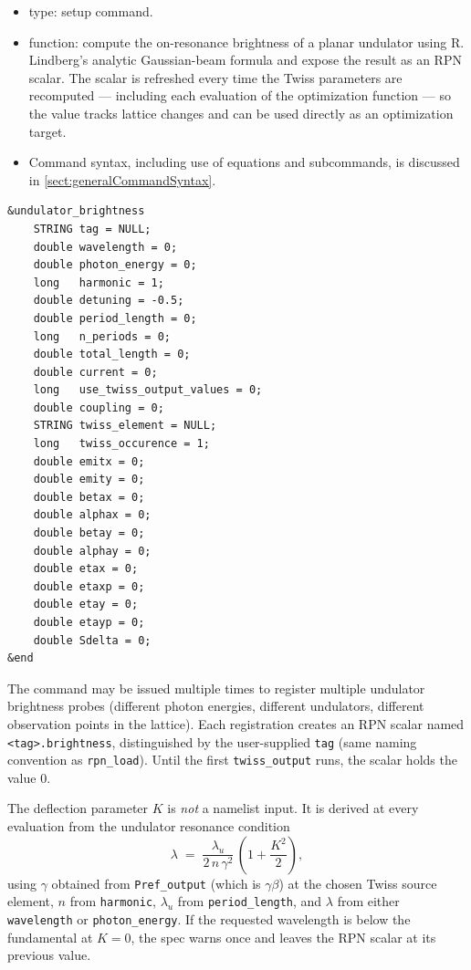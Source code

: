 \documentclass[11pt]{article}
\begin{document}
\begin{itemize}
\item type: setup command.
\item function: compute the on-resonance brightness of a planar undulator
        using R. Lindberg's analytic Gaussian-beam formula and expose the
        result as an RPN scalar.  The scalar is refreshed every time the
        Twiss parameters are recomputed --- including each evaluation of
        the optimization function --- so the value tracks lattice changes
        and can be used directly as an optimization target.
\item Command syntax, including use of equations and subcommands, is
        discussed in \ref{sect:generalCommandSyntax}.
\end{itemize}

\begin{verbatim}
&undulator_brightness
    STRING tag = NULL;
    double wavelength = 0;
    double photon_energy = 0;
    long   harmonic = 1;
    double detuning = -0.5;
    double period_length = 0;
    long   n_periods = 0;
    double total_length = 0;
    double current = 0;
    long   use_twiss_output_values = 0;
    double coupling = 0;
    STRING twiss_element = NULL;
    long   twiss_occurence = 1;
    double emitx = 0;
    double emity = 0;
    double betax = 0;
    double alphax = 0;
    double betay = 0;
    double alphay = 0;
    double etax = 0;
    double etaxp = 0;
    double etay = 0;
    double etayp = 0;
    double Sdelta = 0;
&end
\end{verbatim}

The command may be issued multiple times to register multiple undulator
brightness probes (different photon energies, different undulators,
different observation points in the lattice).  Each registration
creates an RPN scalar named \verb|<tag>.brightness|, distinguished by
the user-supplied \verb|tag| (same naming convention as
\verb|rpn_load|).  Until the first \verb|twiss_output| runs, the
scalar holds the value 0.

The deflection parameter $K$ is {\em not} a namelist input.  It is
derived at every evaluation from the undulator resonance condition
\begin{equation}
\lambda \;=\; \frac{\lambda_u}{2\,n\,\gamma^{2}}\,
              \left(1 + \frac{K^{2}}{2}\right),
\end{equation}
using $\gamma$ obtained from \verb|Pref_output| (which is $\gamma\beta$)
at the chosen Twiss source element, $n$ from \verb|harmonic|,
$\lambda_u$ from \verb|period_length|, and $\lambda$ from either
\verb|wavelength| or \verb|photon_energy|.  If the requested wavelength
is below the fundamental at $K{=}0$, the spec warns once and leaves the
RPN scalar at its previous value.
\end{document}
